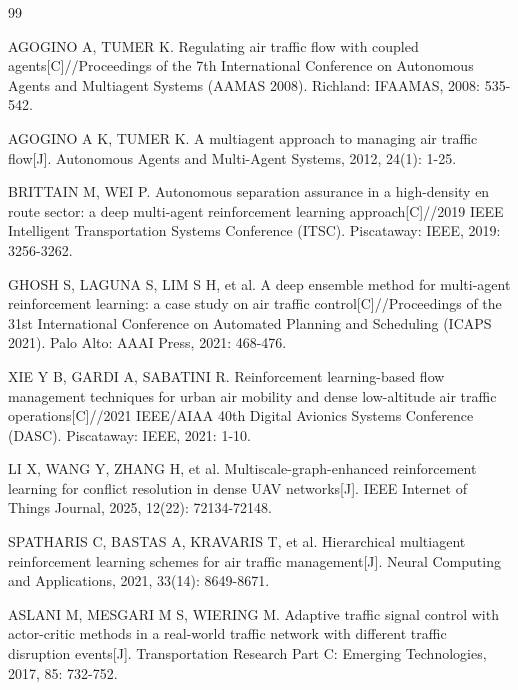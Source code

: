 \documentclass[12pt,a4paper,UTF8]{ctexart}
\begin{document}
\begin{thebibliography}{99}

 AGOGINO A, TUMER K. Regulating air traffic flow with coupled agents[C]//Proceedings of the 7th International Conference on Autonomous Agents and Multiagent Systems (AAMAS 2008). Richland: IFAAMAS, 2008: 535-542.

 AGOGINO A K, TUMER K. A multiagent approach to managing air traffic flow[J]. Autonomous Agents and Multi-Agent Systems, 2012, 24(1): 1-25.

 BRITTAIN M, WEI P. Autonomous separation assurance in a high-density en route sector: a deep multi-agent reinforcement learning approach[C]//2019 IEEE Intelligent Transportation Systems Conference (ITSC). Piscataway: IEEE, 2019: 3256-3262.

 GHOSH S, LAGUNA S, LIM S H, et al. A deep ensemble method for multi-agent reinforcement learning: a case study on air traffic control[C]//Proceedings of the 31st International Conference on Automated Planning and Scheduling (ICAPS 2021). Palo Alto: AAAI Press, 2021: 468-476.

 XIE Y B, GARDI A, SABATINI R. Reinforcement learning-based flow management techniques for urban air mobility and dense low-altitude air traffic operations[C]//2021 IEEE/AIAA 40th Digital Avionics Systems Conference (DASC). Piscataway: IEEE, 2021: 1-10.

 LI X, WANG Y, ZHANG H, et al. Multiscale-graph-enhanced reinforcement learning for conflict resolution in dense UAV networks[J]. IEEE Internet of Things Journal, 2025, 12(22): 72134-72148.

 SPATHARIS C, BASTAS A, KRAVARIS T, et al. Hierarchical multiagent reinforcement learning schemes for air traffic management[J]. Neural Computing and Applications, 2021, 33(14): 8649-8671.

 ASLANI M, MESGARI M S, WIERING M. Adaptive traffic signal control with actor-critic methods in a real-world traffic network with different traffic disruption events[J]. Transportation Research Part C: Emerging Technologies, 2017, 85: 732-752.


\end{thebibliography}
\end{document}
